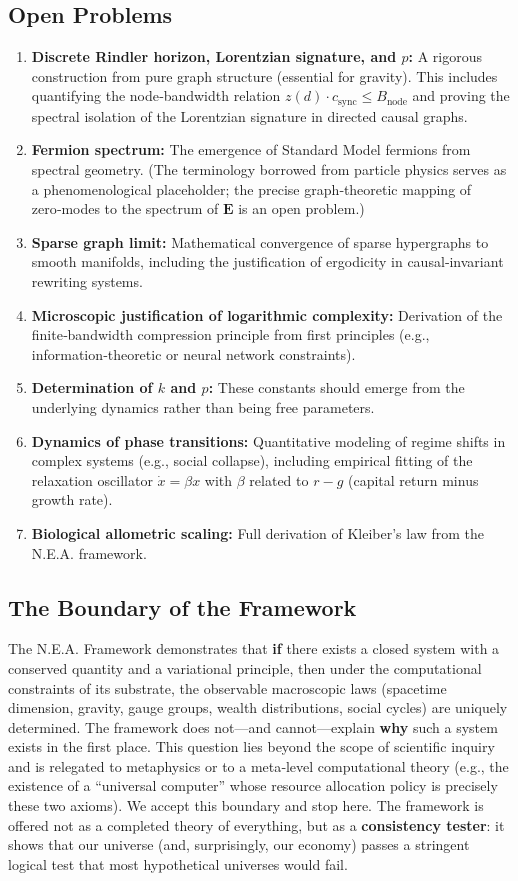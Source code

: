 \documentclass{article}
\begin{document}
\subsection{Open Problems}
\begin{enumerate}
    \item \textbf{Discrete Rindler horizon, Lorentzian signature, and $p$:} A rigorous construction from pure graph structure (essential for gravity). This includes quantifying the node‑bandwidth relation $z(d) \cdot c_{\text{sync}} \le B_{\text{node}}$ and proving the spectral isolation of the Lorentzian signature in directed causal graphs.
    \item \textbf{Fermion spectrum:} The emergence of Standard Model fermions from spectral geometry. (The terminology borrowed from particle physics serves as a phenomenological placeholder; the precise graph‑theoretic mapping of zero‑modes to the spectrum of $\mathbf{E}$ is an open problem.)
    \item \textbf{Sparse graph limit:} Mathematical convergence of sparse hypergraphs to smooth manifolds, including the justification of ergodicity in causal‑invariant rewriting systems.
    \item \textbf{Microscopic justification of logarithmic complexity:} Derivation of the finite‑bandwidth compression principle from first principles (e.g., information‑theoretic or neural network constraints).
    \item \textbf{Determination of $k$ and $p$:} These constants should emerge from the underlying dynamics rather than being free parameters.
    \item \textbf{Dynamics of phase transitions:} Quantitative modeling of regime shifts in complex systems (e.g., social collapse), including empirical fitting of the relaxation oscillator $\dot{x} = \beta x$ with $\beta$ related to $r-g$ (capital return minus growth rate).
    \item \textbf{Biological allometric scaling:} Full derivation of Kleiber’s law from the N.E.A. framework.
\end{enumerate}

\subsection{The Boundary of the Framework}
The N.E.A. Framework demonstrates that \textbf{if} there exists a closed system with a conserved quantity and a variational principle, then under the computational constraints of its substrate, the observable macroscopic laws (spacetime dimension, gravity, gauge groups, wealth distributions, social cycles) are uniquely determined. The framework does not—and cannot—explain \textbf{why} such a system exists in the first place. This question lies beyond the scope of scientific inquiry and is relegated to metaphysics or to a meta‑level computational theory (e.g., the existence of a “universal computer” whose resource allocation policy is precisely these two axioms). We accept this boundary and stop here. The framework is offered not as a completed theory of everything, but as a \textbf{consistency tester}: it shows that our universe (and, surprisingly, our economy) passes a stringent logical test that most hypothetical universes would fail.
\end{document}
